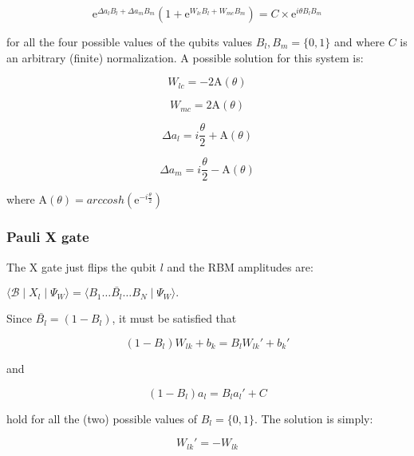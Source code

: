 \begin{equation}
   \mathrm{e}^{\Delta a_{l} B_{l} + \Delta a_{m} B_{m}}(1 + \mathrm{e}^{W_{lc} B_{l} + W_{mc} B_{m}}) = C \times \mathrm{e}^{i \theta B_{l} B_{m}}
\end{equation}

for all the four possible values of the qubits values $B_{l}, B_{m} = \{0,1\}$ and where $C$ is an arbitrary (finite)
normalization. A possible solution for this system is:

\begin{equation}
   W_{lc} = -2\mathrm{A}(\theta) 
\end{equation}

\begin{equation}
   W_{mc} = 2\mathrm{A}(\theta) 
\end{equation}

\begin{equation}
   \Delta a_{l} = i \frac{\theta}{2} + \mathrm{A}(\theta)
\end{equation}

\begin{equation}
   \Delta a_{m} = i \frac{\theta}{2} - \mathrm{A}(\theta)
\end{equation}

where $\mathrm{A}(\theta) = arccosh(\mathrm{e}^{-i \frac{\theta}{2}})$

\subsubsection{Pauli X gate}
The X gate just flips the qubit $l$ and the RBM amplitudes are:

$
    \langle \mathcal{B} \mid X_{l} \mid \Psi_{W}  \rangle = 
    \langle B_{1} \dots \bar{B_{l}} \dots B_{N} \mid \Psi_{W} \rangle.
$

Since $\bar{B_{l}} = (1-B_{l})$, it must be satisfied that

\begin{equation}
    (1-B_{l})W_{lk} + b_{k} = B_{l} W_{lk}\prime + b_{k}\prime
\end{equation}

and

\begin{equation}
   (1-B_{l}) a_{l} = B_{l} a_{l}\prime + C 
\end{equation}

hold for all the (two) possible values of $B_{l} = \{0,1\}$. The solution is simply:

\begin{equation}
   W_{lk}\prime = -W_{lk}
\end{equation}

